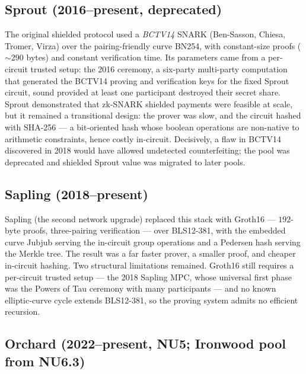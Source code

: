\documentclass[11pt,a4paper]{article}
\theoremstyle{definition}
\begin{document}
\subsection{Sprout (2016--present, deprecated)}

The original shielded protocol used a \emph{BCTV14} SNARK (Ben-Sasson,
Chiesa, Tromer, Virza) over the pairing-friendly curve BN254, with
constant-size proofs ($\sim 290$ bytes) and constant verification time. Its
parameters came from a per-circuit trusted setup: the 2016 ceremony, a
six-party multi-party computation that generated the BCTV14 proving and
verification keys for the fixed Sprout circuit, sound provided at least one
participant destroyed their secret share. Sprout demonstrated that
zk-SNARK shielded payments were feasible at scale, but it remained a
transitional design: the prover was slow, and the circuit hashed with
SHA-256 --- a bit-oriented hash whose boolean operations are non-native to
arithmetic constraints, hence costly in-circuit. Decisively, a flaw in
BCTV14 discovered in 2018 would have allowed undetected counterfeiting; the
pool was deprecated and shielded Sprout value was migrated to later pools.

\subsection{Sapling (2018--present)}

Sapling (the second network upgrade) replaced this stack with Groth16 --- $192$-byte
proofs, three-pairing verification --- over BLS12-381, with the embedded
curve Jubjub serving the in-circuit group operations and a Pedersen hash
serving the Merkle tree. The result was a far faster prover, a smaller
proof, and cheaper in-circuit hashing. Two structural limitations remained.
Groth16 still requires a per-circuit trusted setup --- the 2018 Sapling MPC,
whose universal first phase was the Powers of Tau ceremony with many
participants --- and no known elliptic-curve cycle extends BLS12-381, so the
proving system admits no efficient recursion.

\subsection{Orchard (2022--present, NU5; Ironwood pool from NU6.3)}
\end{document}
